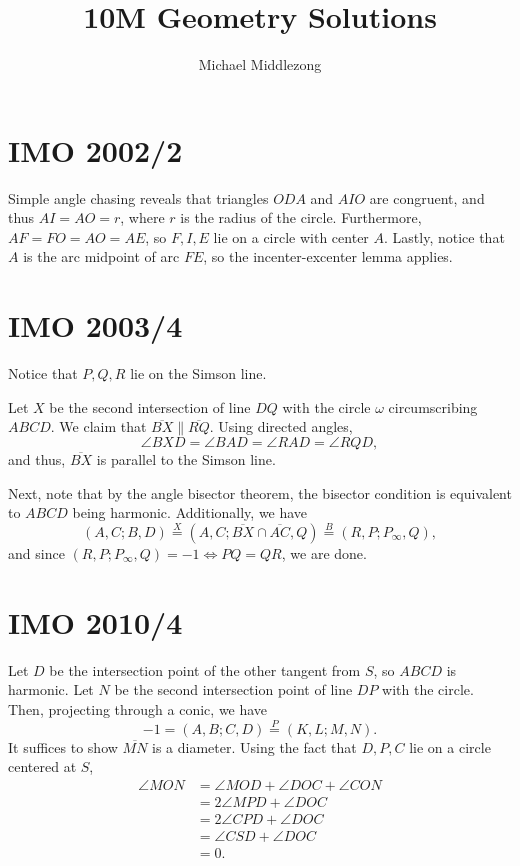 \documentclass{scrartcl}
\title{10M Geometry Solutions}
\author{Michael Middlezong}
\begin{document}
\maketitle

\section*{IMO 2002/2}
Simple angle chasing reveals that triangles $ODA$ and $AIO$ are congruent, and thus $AI = AO = r$, where $r$ is the radius of the circle.
Furthermore, $AF = FO = AO = AE$, so $F,I,E$ lie on a circle with center $A$.
Lastly, notice that $A$ is the arc midpoint of arc $FE$, so the incenter-excenter lemma applies.

\section*{IMO 2003/4}
Notice that $P,Q,R$ lie on the Simson line.

Let $X$ be the second intersection of line $DQ$ with the circle $\omega$ circumscribing $ABCD$.
We claim that $\overline{BX} \parallel \overline{RQ}$.
Using directed angles,
\[ \angle BXD = \angle BAD = \angle RAD = \angle RQD, \]
and thus, $\overline{BX}$ is parallel to the Simson line.

Next, note that by the angle bisector theorem, the bisector condition is equivalent to $ABCD$ being harmonic.
Additionally, we have
\[ (A,C;B,D) \stackrel{X}{=} (A,C;\overline{BX} \cap \overline{AC}, Q) \stackrel{B}{=} (R,P;P_\infty,Q), \]
and since $(R,P;P_\infty,Q) = -1 \iff PQ=QR$, we are done.

\section*{IMO 2010/4}
Let $D$ be the intersection point of the other tangent from $S$, so $ABCD$ is harmonic.
Let $N$ be the second intersection point of line $DP$ with the circle.
Then, projecting through a conic, we have
\[ -1 = (A,B;C,D) \stackrel{P}{=} (K,L;M,N). \]
It suffices to show $\overline{MN}$ is a diameter.
Using the fact that $D,P,C$ lie on a circle centered at $S$,
\begin{align*}
    \angle MON &= \angle MOD + \angle DOC + \angle CON \\
    &= 2\angle MPD + \angle DOC \\
    &= 2\angle CPD + \angle DOC \\
    &= \angle CSD + \angle DOC \\
    &= 0.
\end{align*}
\end{document}

